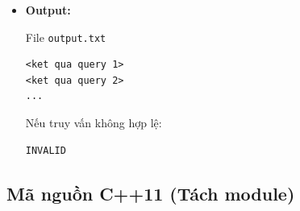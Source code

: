 \begin{itemize}
\begin{itemize}
    \end{itemize}

    \item \textbf{Output:}

    File \texttt{output.txt}

\begin{lstlisting}
<ket qua query 1>
<ket qua query 2>
...
\end{lstlisting}

    Nếu truy vấn không hợp lệ:
\begin{lstlisting}
INVALID
\end{lstlisting}

\end{itemize}

\subsection{Mã nguồn C++11 (Tách module)}

